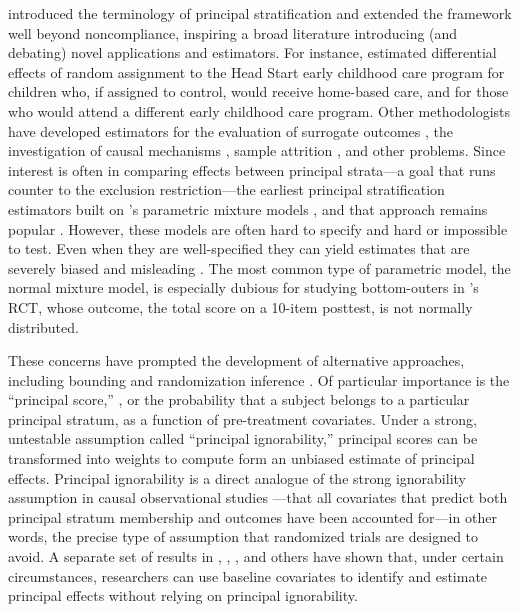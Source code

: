 \documentclass[]{article}
\begin{document}
\citet{frangakis} introduced the terminology of principal stratification and extended the framework well beyond noncompliance, inspiring a broad literature introducing (and debating) novel applications and estimators.
For instance, \citet{fellerEtAl2016} estimated differential effects of random assignment to the Head Start early childhood care program for children who, if assigned to control, would receive home-based care, and for those who would attend a different early childhood care program.
Other methodologists have developed estimators for the evaluation of surrogate outcomes \citep{li2010bayesian}, the investigation of causal mechanisms \citep{lidsayPage}, sample attrition \citep{zhangRubin, ding2011}, and other problems.
Since interest is often in comparing effects between principal strata---a goal that runs counter to the exclusion restriction---the earliest principal stratification estimators built on \citet{imbens1997bayesian}'s parametric mixture models \citep[e.g.][]{Barnard01062003,mealli2004analyzing}, and that approach remains popular \citep{lidsayPage,fellerEtAl2016}.
However, these models are often hard to specify and hard or impossible to test.
Even when they are well-specified they can yield estimates that are severely biased and misleading \citep{griffin2008application,feller2016principal}.
The most common type of parametric model, the normal mixture model, is especially dubious for studying bottom-outers in \citet{impactPaper}'s RCT, whose outcome, the total score on a 10-item posttest, is not normally distributed.

These concerns have prompted the development of alternative approaches, including bounding \citep{bounding} and randomization inference \citep{nolen2011randomization}.
Of particular importance is the ``principal score,'' \citep{jo,dingLu,feller2017principal}, or the probability that a subject belongs to a particular principal stratum, as a function of pre-treatment covariates.
Under a strong, untestable assumption called ``principal ignorability,''  principal scores can be transformed into weights to compute form an unbiased estimate of principal effects.
Principal ignorability is a direct analogue of the strong ignorability assumption in causal observational studies \citep[e.g.][]{rosenbaum1983central}---that all covariates that predict both principal stratum membership and outcomes have been accounted for---in other words, the precise type of assumption that randomized trials are designed to avoid.
A separate set of results in \citet{jo2002}, \citet{ding2011}, \citet{jiangDing2021}, and others have shown that, under certain circumstances, researchers can use baseline covariates to identify and estimate principal effects without relying on principal ignorability.
\end{document}
